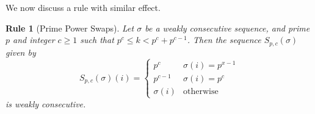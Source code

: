 \documentclass{article}
\newtheorem{rul}{Rule}
\theoremstyle{definition}
\theoremstyle{remark}
\numberwithin{equation}{section}
\numberwithin{case}{theorem}
\begin{document}

We now discuss a rule with similar effect.

\begin{rul}[Prime Power Swaps] \label{rul:prime_power_swaps}
    Let $\sigma$ be a weakly consecutive sequence, and prime $p$ and integer $c \geq 1$ such that $p^c \leq k < p^c + p^{c-1}$. Then the sequence $S_{p,c}(\sigma)$ given by 
    $$S_{p,c}(\sigma)(i) = \begin{cases} 
          p^c & \sigma(i) = p^{x-1} \\
          p^{c-1} & \sigma(i) = p^c \\
          \sigma(i) & \text{otherwise}
       \end{cases}$$
    is weakly consecutive. 
\end{rul}
\end{document}
